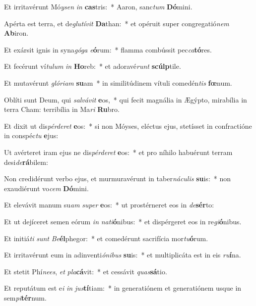 \item Et irritavérunt Mó\textit{y}\textit{sen} \textit{in} \textbf{cas}tris:~* Aaron, sanc\textit{tum} \textbf{Dó}mini.
\item Apérta est terra, et de\textit{glu}\textit{tí}\textit{vit} \textbf{Da}than:~* et opéruit super congregatió\textit{nem} \textbf{Ab}iron.
\item Et exársit ignis in syna\textit{gó}\textit{ga} \textit{e}\textbf{ó}rum:~* flamma combússit pec\textit{ca}\textbf{tó}res.
\item Et fecérunt ví\textit{tu}\textit{lum} \textit{in} \textbf{Ho}reb:~* et adoravé\textit{runt} \textbf{scúlp}tile.
\item Et mutavérunt \textit{gló}\textit{ri}\textit{am} \textbf{su}am~* in similitúdinem vítuli comedén\textit{tis} \textbf{fœ}num.
\item Oblíti sunt Deum, qui \textit{sal}\textit{vá}\textit{vit} \textbf{e}os,~* qui fecit magnália in Ægýpto, mirabília in terra Cham: terribília in Ma\textit{ri} \textbf{Ru}bro.
\item Et dixit ut dis\textit{pér}\textit{de}\textit{ret} \textbf{e}os:~* si non Móyses, eléctus ejus, stetísset in confractióne in conspéc\textit{tu} \textbf{e}jus:
\item Ut avérteret iram ejus ne dis\textit{pér}\textit{de}\textit{ret} \textbf{e}os:~* et pro níhilo habuérunt terram desi\textit{de}\textbf{rá}bilem:
\item Non credidérunt verbo ejus, et murmuravérunt in taber\textit{ná}\textit{cu}\textit{lis} \textbf{su}is:~* non exaudiérunt vo\textit{cem} \textbf{Dó}mini.
\item Et elevávit manum su\textit{am} \textit{su}\textit{per} \textbf{e}os:~* ut prostérneret eos in \textit{de}\textbf{sér}to:
\item Et ut dejíceret semen eórum \textit{in} \textit{na}\textit{ti}\textbf{ó}nibus:~* et dispérgeret eos in re\textit{gi}\textbf{ó}nibus.
\item Et initiá\textit{ti} \textit{sunt} \textit{Be}\textbf{él}phegor:~* et comedérunt sacrifícia mor\textit{tu}\textbf{ó}rum.
\item Et irritavérunt eum in adinventi\textit{ó}\textit{ni}\textit{bus} \textbf{su}is:~* et multiplicáta est in eis \textit{ru}\textbf{í}na.
\item Et stetit Phí\textit{nees}, \textit{et} \textit{pla}\textbf{cá}vit:~* et cessávit \textit{quas}\textbf{sá}tio.
\item Et reputátum est e\textit{i} \textit{in} \textit{jus}\textbf{tí}tiam:~* in generatiónem et generatiónem usque in sem\textit{pi}\textbf{tér}num.
